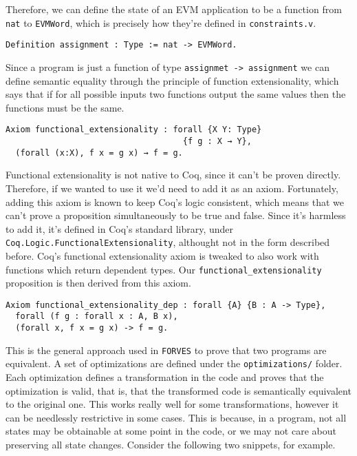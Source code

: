 Therefore, we can define the state of an EVM application to be a function from \texttt{nat} to \texttt{EVMWord},
which is precisely how they're defined in \verb|constraints.v|.

\begin{verbatim}
Definition assignment : Type := nat -> EVMWord.
\end{verbatim}

Since a program is just a function of type \texttt{assignmet -> assignment} we can define semantic equality
through the principle of function extensionality, which says that if for all possible inputs two
functions output the same values then the functions must be the same.

\begin{verbatim}
Axiom functional_extensionality : forall {X Y: Type}
                                    {f g : X → Y},
  (forall (x:X), f x = g x) → f = g.
\end{verbatim}

Functional extensionality is not native to Coq, since it can't be proven directly. Therefore, if we
wanted to use it we'd need to add it as an axiom. Fortunately, adding this axiom is known to keep
Coq's logic consistent, which means that we can't prove a proposition simultaneously to be true and 
false. Since it's harmless to add it, it's defined in Coq's standard library, under 
\texttt{Coq.Logic.FunctionalExtensionality}, althought not in the form described before. Coq's functional
extensionality axiom is tweaked to also work with functions which return dependent types. Our 
\texttt{functional_extensionality} proposition is then derived from this axiom.

\begin{verbatim}
Axiom functional_extensionality_dep : forall {A} {B : A -> Type},
  forall (f g : forall x : A, B x),
  (forall x, f x = g x) -> f = g.
\end{verbatim}

This is the general approach used in \texttt{FORVES} to prove that two programs are equivalent. A set of
optimizations are defined under the \texttt{optimizations/} folder. Each optimization defines a transformation
in the code and proves that the optimization is valid, that is, that the transformed code is semantically
equivalent to the original one. This works really well for some transformations, however it can be 
needlessly restrictive in some cases. This is because, in a program, not all states may be obtainable at
some point in the code, or we may not care about preserving all state changes. Consider the following two
snippets, for example.

